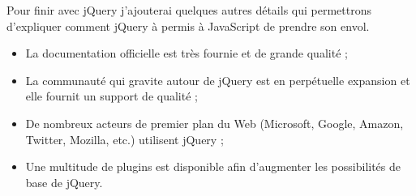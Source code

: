 Pour finir avec jQuery j'ajouterai quelques autres détails qui permettrons d'expliquer comment jQuery à permis à JavaScript de prendre son envol.

\begin{itemize}

  \item[\textbullet]
  La documentation officielle est très fournie et de grande qualité ;
  
  \item[\textbullet]
  La communauté qui gravite autour de jQuery est en perpétuelle expansion et elle fournit un support de qualité ;
  
  \item[\textbullet]
  De nombreux acteurs de premier plan du Web (Microsoft, Google, Amazon, Twitter, Mozilla, etc.) utilisent jQuery ;
  
  \item[\textbullet]
  Une multitude de plugins est disponible afin d'augmenter les possibilités de base de jQuery.
  
\end{itemize}